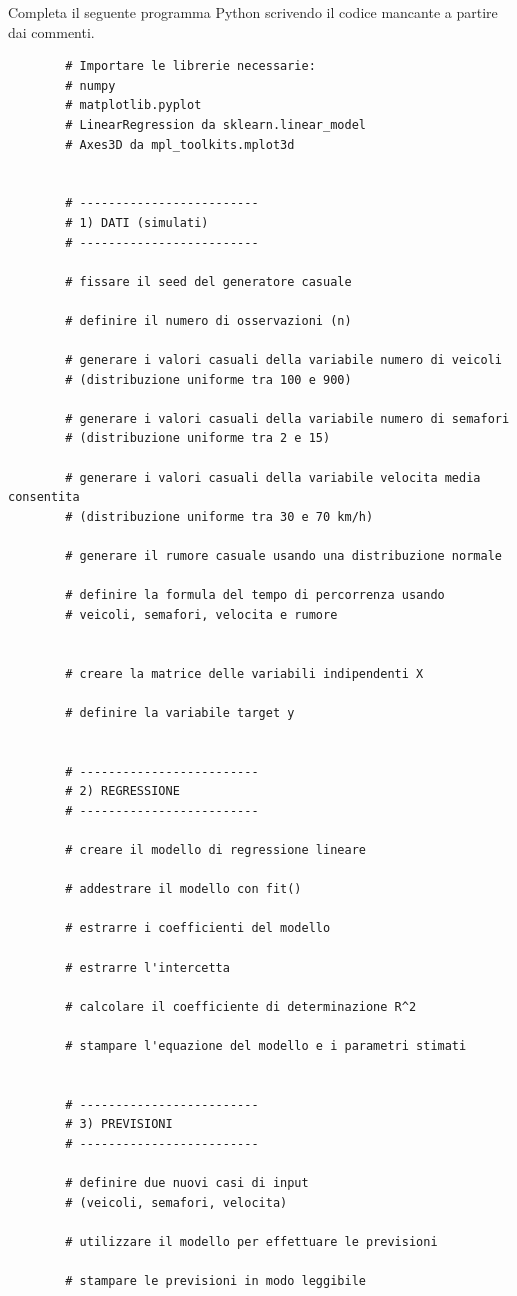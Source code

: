 \documentclass[a4paper,12pt]{article}
\begin{document}
	Completa il seguente programma Python scrivendo il codice mancante a partire dai commenti.
	
	\begin{lstlisting}
		# Importare le librerie necessarie:
		# numpy
		# matplotlib.pyplot
		# LinearRegression da sklearn.linear_model
		# Axes3D da mpl_toolkits.mplot3d
		
		
		# -------------------------
		# 1) DATI (simulati)
		# -------------------------
		
		# fissare il seed del generatore casuale
		
		# definire il numero di osservazioni (n)
		
		# generare i valori casuali della variabile numero di veicoli
		# (distribuzione uniforme tra 100 e 900)
		
		# generare i valori casuali della variabile numero di semafori
		# (distribuzione uniforme tra 2 e 15)
		
		# generare i valori casuali della variabile velocita media consentita
		# (distribuzione uniforme tra 30 e 70 km/h)
		
		# generare il rumore casuale usando una distribuzione normale
		
		# definire la formula del tempo di percorrenza usando
		# veicoli, semafori, velocita e rumore
		
		
		# creare la matrice delle variabili indipendenti X
		
		# definire la variabile target y
		
		
		# -------------------------
		# 2) REGRESSIONE
		# -------------------------
		
		# creare il modello di regressione lineare
		
		# addestrare il modello con fit()
		
		# estrarre i coefficienti del modello
		
		# estrarre l'intercetta
		
		# calcolare il coefficiente di determinazione R^2
		
		# stampare l'equazione del modello e i parametri stimati
		
		
		# -------------------------
		# 3) PREVISIONI
		# -------------------------
		
		# definire due nuovi casi di input
		# (veicoli, semafori, velocita)
		
		# utilizzare il modello per effettuare le previsioni
		
		# stampare le previsioni in modo leggibile
		

\end{lstlisting}
\end{document}
